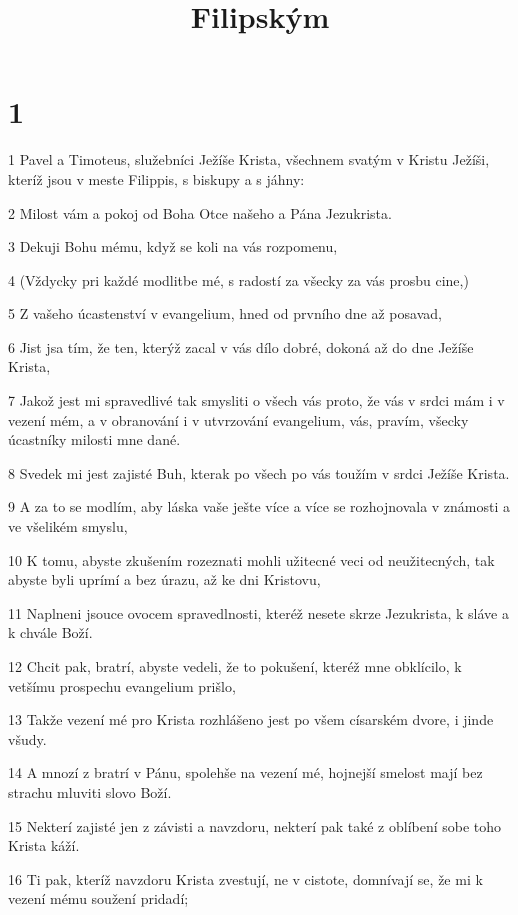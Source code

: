 

\title{Filipským}

\chapter{1}

\par 1 Pavel a Timoteus, služebníci Ježíše Krista, všechnem svatým v Kristu Ježíši, kteríž jsou v meste Filippis, s biskupy a s jáhny:
\par 2 Milost vám a pokoj od Boha Otce našeho a Pána Jezukrista.
\par 3 Dekuji Bohu mému, když se koli na vás rozpomenu,
\par 4 (Vždycky pri každé modlitbe mé, s radostí za všecky za vás prosbu cine,)
\par 5 Z vašeho úcastenství v evangelium, hned od prvního dne až posavad,
\par 6 Jist jsa tím, že ten, kterýž zacal v vás dílo dobré, dokoná až do dne Ježíše Krista,
\par 7 Jakož jest mi spravedlivé tak smysliti o všech vás proto, že vás v srdci mám i v vezení mém, a v obranování i v utvrzování evangelium, vás, pravím, všecky úcastníky milosti mne dané.
\par 8 Svedek mi jest zajisté Buh, kterak po všech po vás toužím v srdci Ježíše Krista.
\par 9 A za to se modlím, aby láska vaše ješte více a více se rozhojnovala v známosti a ve všelikém smyslu,
\par 10 K tomu, abyste zkušením rozeznati mohli užitecné veci od neužitecných, tak abyste byli uprímí a bez úrazu, až ke dni Kristovu,
\par 11 Naplneni jsouce ovocem spravedlnosti, kteréž nesete skrze Jezukrista, k sláve a k chvále Boží.
\par 12 Chcit pak, bratrí, abyste vedeli, že to pokušení, kteréž mne obklícilo, k vetšímu prospechu evangelium prišlo,
\par 13 Takže vezení mé pro Krista rozhlášeno jest po všem císarském dvore, i jinde všudy.
\par 14 A mnozí z bratrí v Pánu, spolehše na vezení mé, hojnejší smelost mají bez strachu mluviti slovo Boží.
\par 15 Nekterí zajisté jen z závisti a navzdoru, nekterí pak také z oblíbení sobe toho Krista káží.
\par 16 Ti pak, kteríž navzdoru Krista zvestují, ne v cistote, domnívají se, že mi k vezení mému soužení pridadí;
